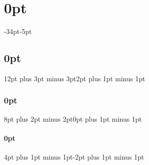 \titlespacing\chapter{0pt}{-34pt}{-5pt}
\titlespacing\section{0pt}{12pt plus 3pt minus 3pt}{2pt plus 1pt minus 1pt}
\titlespacing\subsection{0pt}{8pt plus 2pt minus 2pt}{0pt plus 1pt minus 1pt}
\titlespacing\subsubsection{0pt}{4pt plus 1pt minus 1pt}{-2pt plus 1pt minus 1pt}
\captionsetup{belowskip=0pt,aboveskip=5pt plus 1pt minus 1pt}

\setlength{\textfloatsep}{0pt}
\setlength{\intextsep}{5pt}
\newcommand{\squeezeup}{\vspace{-4mm}}



\usetikzlibrary{spy}    %
\pgfplotsset{compat=1.15}
\usetikzlibrary{calc}
\usetikzlibrary{pgfplots.colormaps} %

